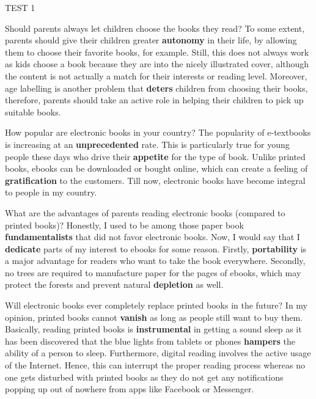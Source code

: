 \begin{glossarymc}[Cambridge 14]
\begin{test}{TEST 1}
    \begin{qa}{Should parents always let children choose the books they read?}
    To some extent, parents should give their children greater \textbf{autonomy} in their life, by allowing them to choose their favorite books, for example. Still, this does not always work as kids choose a book because they are into the nicely illustrated cover, although the content is not actually a match for their interests or reading level. Moreover, age labelling is another problem that \textbf{deters} children from choosing their books, therefore, parents should take an active role in helping their children to pick up suitable books.
    \end{qa}

    \begin{qa}{How popular are electronic books in your country?}
    The popularity of e-textbooks is increasing at an \textbf{unprecedented} rate. This is particularly true for young people these days who drive their \textbf{appetite} for the type of book. Unlike printed books, ebooks can be downloaded or bought online, which can create a feeling of \textbf{gratification} to the customers. Till now, electronic books have become integral to people in my country.
    \end{qa}

    \begin{qa}{What are the advantages of parents reading electronic books (compared to printed books)?}
    Honestly, I used to be among those paper book \textbf{fundamentalists} that did not favor electronic books. Now, I would say that I \textbf{dedicate} parts of my interest to ebooks for some reason. Firstly, \textbf{portability} is a major advantage for readers who want to take the book everywhere. Secondly, no trees are required to manufacture paper for the pages of ebooks, which may protect the forests and prevent natural \textbf{depletion} as well.
    \end{qa}

    \begin{qa}{Will electronic books ever completely replace printed books in the future?}
    In my opinion, printed books cannot \textbf{vanish} as long as people still want to buy them. Basically, reading printed books is \textbf{instrumental} in getting a sound sleep as it has been discovered that the blue lights from tablets or phones \textbf{hampers} the ability of a person to sleep. Furthermore, digital reading involves the active usage of the Internet. Hence, this can interrupt the proper reading process whereas no one gets disturbed with printed books as they do not get any notifications popping up out of nowhere from apps like Facebook or Messenger.
    \end{qa}


\end{test}
\end{glossarymc}
